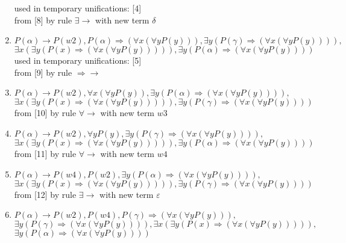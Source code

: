 \documentclass{cw1}
\begin{document}
\begin{enumerate}
  used in temporary unifications: [4]\\
 from [8] by rule $\exists \rightarrow $ with new term $\delta$
\item $P(\alpha) \rightarrow  P(w2), P(\alpha)  \Rightarrow  ( \forall  x ( \forall  y P(y))),\exists  y (P(\gamma)  \Rightarrow  ( \forall  x ( \forall  y P(y)))),$\\$\exists  x ( \exists  y (P(x)  \Rightarrow  ( \forall  x ( \forall  y P(y))))),  \exists  y (P(\alpha)  \Rightarrow  ( \forall  x ( \forall  y P(y))))$\\
  used in temporary unifications: [5]\\
 from [9] by rule $ \Rightarrow \rightarrow $
\item $P(\alpha) \rightarrow  P(w2),  \forall  x ( \forall  y P(y)),  \exists  y (P(\alpha)  \Rightarrow  ( \forall  x ( \forall  y P(y)))),$\\$  \exists  x ( \exists  y (P(x)  \Rightarrow  ( \forall  x ( \forall  y P(y))))),  \exists  y (P(\gamma)  \Rightarrow  ( \forall  x ( \forall  y P(y))))$\\
 from [10] by rule $\forall \rightarrow $ with new term $w3$
\item $P(\alpha) \rightarrow  P(w2),  \forall  y P(y),  \exists  y (P(\gamma)  \Rightarrow  ( \forall  x ( \forall  y P(y)))),$\\$  \exists  x ( \exists  y (P(x)  \Rightarrow  ( \forall  x ( \forall  y P(y))))),  \exists  y (P(\alpha)  \Rightarrow  ( \forall  x ( \forall  y P(y))))$\\
 from [11] by rule $\forall \rightarrow $ with new term $w4$
\item $P(\alpha) \rightarrow  P(w4), P(w2),  \exists  y (P(\alpha)  \Rightarrow  ( \forall  x ( \forall  y P(y)))),$\\$  \exists  x ( \exists  y (P(x)  \Rightarrow  ( \forall  x ( \forall  y P(y))))),  \exists  y (P(\gamma)  \Rightarrow  ( \forall  x ( \forall  y P(y))))$\\
 from [12] by rule $\exists \rightarrow $ with new term $\varepsilon$
\item $P(\alpha) \rightarrow  P(w2), P(w4), P(\gamma)  \Rightarrow  ( \forall  x ( \forall  y P(y))),$\\$  \exists  y (P(\gamma)  \Rightarrow  ( \forall  x ( \forall  y P(y)))),  \exists  x ( \exists  y (P(x)  \Rightarrow  ( \forall  x ( \forall  y P(y))))),$\\$\exists  y (P(\alpha)  \Rightarrow  ( \forall  x ( \forall  y P(y))))$\\

\end{enumerate}
\end{document}
